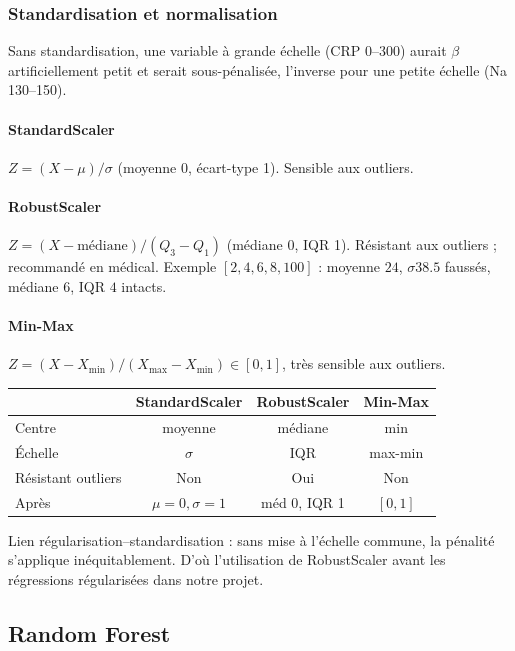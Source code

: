 \documentclass[12pt,a4paper]{report}
\begin{document}
\subsubsection{Standardisation et normalisation}

Sans standardisation, une variable à grande échelle (CRP 0--300) aurait $\beta$
artificiellement
petit et serait sous-pénalisée, l'inverse pour une petite échelle (Na 130--150).

\paragraph{StandardScaler} $Z=(X-\mu)/\sigma$ (moyenne 0, écart-type 1). Sensible aux
outliers.

\paragraph{RobustScaler} $Z=(X-\text{médiane})/(Q_3-Q_1)$ (médiane 0, IQR 1). Résistant aux
outliers ; recommandé en médical. Exemple $[2,4,6,8,100]$ : moyenne $24$, $\sigma 38.5$
faussés, médiane $6$, IQR $4$ intacts.

\paragraph{Min-Max} $Z=(X-X_{\min})/(X_{\max}-X_{\min})\in[0,1]$, très sensible aux outliers.

\begin{center}
\begin{tabular}{@{}l c c c@{}}
\toprule
 & StandardScaler & RobustScaler & Min-Max \\
\midrule
Centre & moyenne & médiane & min \\
Échelle & $\sigma$ & IQR & max-min \\
Résistant outliers & Non & Oui & Non \\
Après & $\mu=0,\sigma=1$ & méd 0, IQR 1 & $[0,1]$ \\
\bottomrule
\end{tabular}
\end{center}
Lien régularisation--standardisation : sans mise à l'échelle commune, la pénalité
s'applique
inéquitablement. D'où l'utilisation de RobustScaler avant les régressions régularisées dans notre projet.

\subsection{Random Forest}
\end{document}

